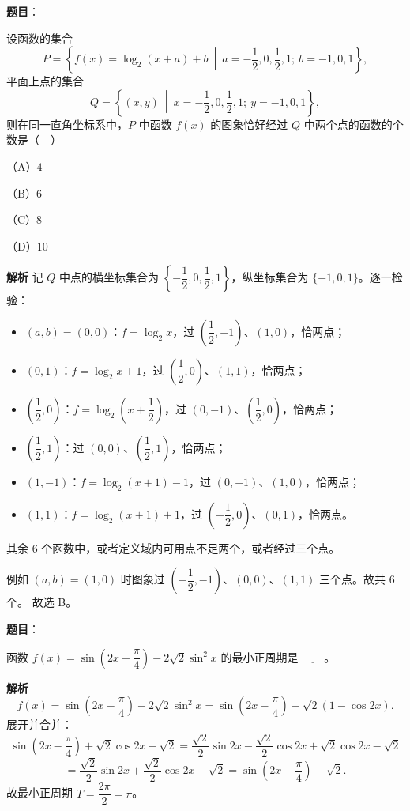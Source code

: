 \begin{answer}

\textbf{题目}：

设函数的集合
\nopagebreak[4]
\[P=\left\{f(x)=\log_2(x+a)+b\ \middle|\ a=-\frac12,0,\frac12,1;\ b=-1,0,1\right\},\]
平面上点的集合
\nopagebreak[4]
\[Q=\left\{(x,y)\ \middle|\ x=-\frac12,0,\frac12,1;\ y=-1,0,1\right\},\]
则在同一直角坐标系中，$P$ 中函数 $f(x)$ 的图象恰好经过 $Q$ 中两个点的函数的个数是（　）

（A）$4$

（B）$6$

（C）$8$

（D）$10$

\textbf{解析}
记 $Q$ 中点的横坐标集合为 $\left\{-\dfrac12,0,\dfrac12,1\right\}$，纵坐标集合为 $\{-1,0,1\}$。逐一检验：
\begin{itemize}
\item $(a,b)=(0,0)$：$f=\log_2x$，过 $\left(\dfrac12,-1\right)$、$(1,0)$，恰两点；
\item $(0,1)$：$f=\log_2x+1$，过 $\left(\dfrac12,0\right)$、$(1,1)$，恰两点；
\item $\left(\dfrac12,0\right)$：$f=\log_2\left(x+\dfrac12\right)$，过 $(0,-1)$、$\left(\dfrac12,0\right)$，恰两点；
\item $\left(\dfrac12,1\right)$：过 $(0,0)$、$\left(\dfrac12,1\right)$，恰两点；
\item $(1,-1)$：$f=\log_2(x+1)-1$，过 $(0,-1)$、$(1,0)$，恰两点；
\item $(1,1)$：$f=\log_2(x+1)+1$，过 $\left(-\dfrac12,0\right)$、$(0,1)$，恰两点。
\end{itemize}
其余 $6$ 个函数中，或者定义域内可用点不足两个，或者经过三个点。

例如 $(a,b)=(1,0)$ 时图象过
$\left(-\dfrac12,-1\right)$、$(0,0)$、$(1,1)$ 三个点。故共 $6$ 个。
故选 B。


\end{answer}
\begin{answer}

\textbf{题目}：

函数 $f(x)=\sin\left(2x-\dfrac{\pi}{4}\right)-2\sqrt2\sin^2x$ 的最小正周期是 $\underline{\qquad}$。

\textbf{解析}
\nopagebreak[4]
\[f(x)=\sin\left(2x-\frac\pi4\right)-2\sqrt2\sin^2x
=\sin\left(2x-\frac\pi4\right)-\sqrt2(1-\cos2x).\]
展开并合并：
\nopagebreak[4]
\[\sin\left(2x-\frac\pi4\right)+\sqrt2\cos2x-\sqrt2
=\frac{\sqrt2}2\sin2x-\frac{\sqrt2}2\cos2x+\sqrt2\cos2x-\sqrt2\]
\nopagebreak[4]
\[=\frac{\sqrt2}2\sin2x+\frac{\sqrt2}2\cos2x-\sqrt2
=\sin\left(2x+\frac\pi4\right)-\sqrt2.\]
故最小正周期 $T=\dfrac{2\pi}2=\pi$。


\end{answer}
